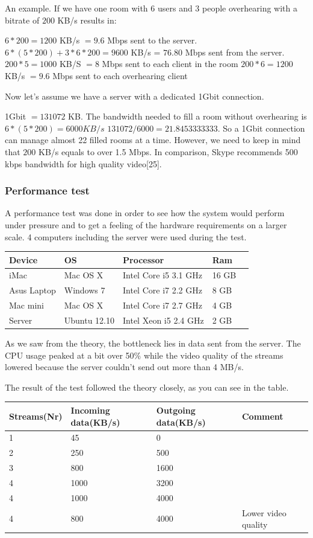 \documentclass[12pt, titlepage]{article}
\begin{document}
An example. If we have one room with 6 users and 3 people overhearing with a bitrate of $200$ KB/s results in:

$6*200 = 1 200$ KB/s $= 9.6$ Mbps sent to the server.
$6*(5*200) + 3*6*200 = 9 600$ KB/s = $76.80$ Mbps sent from the server.
$200*5 = 1000$ KB/S  $= 8$ Mbps sent to each client in the room
$200*6 = 1200$ KB/s $= 9.6$ Mbps sent to each overhearing client

Now let's assume we have a server with a dedicated 1Gbit connection.

1Gbit $= 131 072$ KB.
The bandwidth needed to fill a room without overhearing is $6*(5*200) = 6 000 KB/s$
$131 072/6 000 = 21.8453333333$. So a 1Gbit connection can manage almost 22 filled rooms at a time. However, we need to keep in mind that $200$ KB/s equals to over 1.5 Mbps. In comparison, Skype recommends 500 kbps bandwidth for high quality video[25].
\subsubsection{Performance test}

A performance test was done in order to see how the system would perform under pressure and to get a feeling of the hardware requirements on a larger scale. 4 computers including the server were used during the test.
\begin{center}
    \begin{tabular}{| l | l | l | l | l |}
    \hline
    Device & OS & Processor & Ram \\ \hline
    iMac & Mac OS X & Intel Core i5 3.1 GHz & 16 GB\\ \hline
    Asus Laptop & Windows 7 & Intel Core i7 2.2 GHz & 8 GB \\ \hline
    Mac mini & Mac OS X & Intel Core i7 2.7 GHz & 4 GB \\ \hline
    Server & Ubuntu 12.10 & Intel Xeon i5 2.4 GHz & 2 GB\\ \hline
    \end{tabular}
\end{center}
As we saw from the theory, the bottleneck lies in data sent from the server. The CPU usage peaked at a bit over 50\% while the video quality of the streams lowered because the server couldn't send out more than 4 MB/s.

The result of the test followed the theory closely, as you can see in the table.

\begin{center}
    \begin{tabular}{| l | l | l | l |}
    \hline
    Streams(Nr) & Incoming data(KB/s) & Outgoing data(KB/s) & Comment \\ \hline
    1 & 45 & 0 & \\ \hline
    2 & 250 & 500 & \\ \hline
    3 & 800 & 1600 & \\ \hline
    4 & 1000 & 3200 &\\ \hline
    4 & 1000 & 4000 &\\ \hline
    4 & 800 & 4000 & Lower video quality\\ \hline
    \end{tabular}
\end{center}
\end{document}
